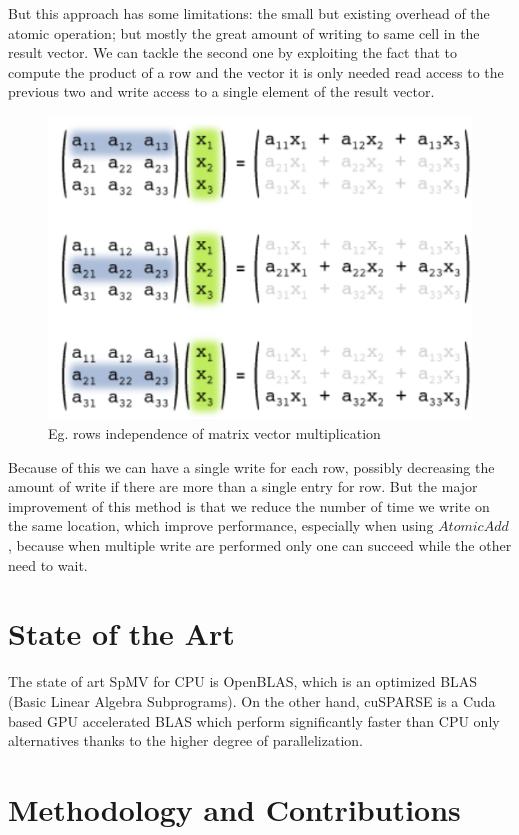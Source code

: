 \documentclass[conference]{IEEEtran}
\begin{document}
But this approach has some limitations: the small but existing overhead of the atomic operation; but mostly the great amount of writing to same cell in the result vector. We can tackle the second one by exploiting the fact that to compute the product of a row and the vector it is only needed read access to the previous two and write access to a single element of the result vector.
\begin{figure}[h!]
	\centering
	\includegraphics[width=0.7\linewidth]{other_img/row-independence}
	\caption{Eg. rows independence of matrix vector multiplication  }
	\label{fig:row-independence}
\end{figure}

Because of this we can have a single write for each row, possibly decreasing the amount of write if there are more than a single entry for row. But the major improvement of this method is that we reduce the number of time we write on the same location, which improve performance, especially when using $AtomicAdd$, because when multiple write are performed only one can succeed while the other need to wait.

\section{State of the Art}
The state of art SpMV for CPU is OpenBLAS, which is an optimized BLAS (Basic Linear Algebra Subprograms). On the other hand, cuSPARSE is a Cuda based GPU accelerated BLAS which perform significantly faster than CPU only alternatives thanks to the higher degree of parallelization.

\section{Methodology and Contributions}\label{sec:methodology}

\end{document}
